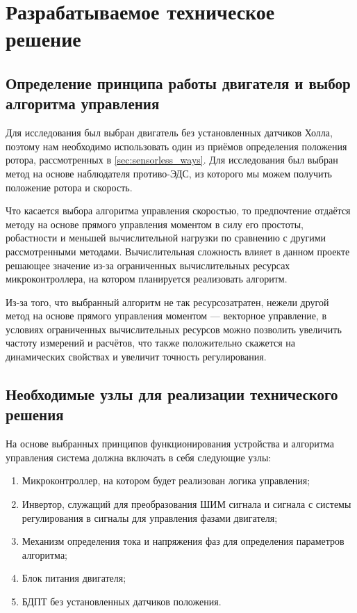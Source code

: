 \chapter{Разрабатываемое техническое решение}
\label{cha:chap3}

\section{Определение принципа работы двигателя и выбор алгоритма управления}

Для исследования был выбран двигатель без установленных датчиков Холла, поэтому нам необходимо использовать один из приёмов определения положения ротора, рассмотренных в \ref{sec:sensorless_ways}. Для исследования был выбран метод на основе наблюдателя противо-ЭДС, из которого мы можем получить положение ротора и скорость.

Что касается выбора алгоритма управления скоростью, то предпочтение отдаётся методу на основе прямого управления моментом в силу его простоты, робастности и меньшей вычислительной нагрузки по сравнению с другими рассмотренными методами. Вычислительная сложность влияет в данном проекте решающее значение из-за ограниченных вычислительных ресурсах микроконтроллера, на котором планируется реализовать алгоритм.

Из-за того, что выбранный алгоритм не так ресурсозатратен, нежели другой метод на основе прямого управления моментом --- векторное управление, в условиях ограниченных вычислительных ресурсов можно позволить увеличить частоту измерений и расчётов, что также положительно скажется на динамических свойствах и увеличит точность регулирования.

\section{Необходимые узлы для реализации технического решения}
\label{sec:nodes}

На основе выбранных принципов функционирования устройства и алгоритма управления система должна включать в себя следующие узлы:
\begin{enumerate}
	\item Микроконтроллер, на котором будет реализован логика управления;
	\item Инвертор, служащий для преобразования ШИМ сигнала и сигнала с системы регулирования в сигналы для управления фазами двигателя;
	\item Механизм определения тока и напряжения фаз для определения параметров алгоритма;
	\item Блок питания двигателя;
	\item БДПТ без установленных датчиков положения.
\end{enumerate}
